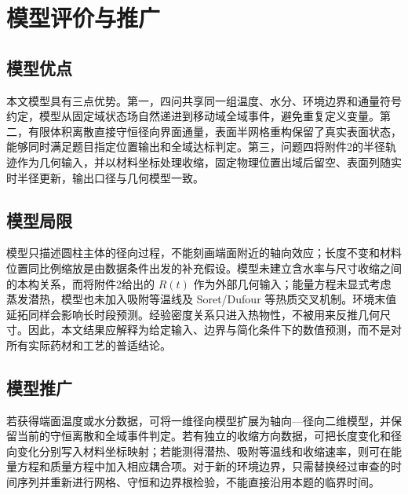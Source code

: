 \section{模型评价与推广}

\subsection{模型优点}

本文模型具有三点优势。第一，四问共享同一组温度、水分、环境边界和通量符号约定，模型从固定域状态场自然递进到移动域全域事件，避免重复定义变量。第二，有限体积离散直接守恒径向界面通量，表面半网格重构保留了真实表面状态，能够同时满足题目指定位置输出和全域达标判定。第三，问题四将附件2的半径轨迹作为几何输入，并以材料坐标处理收缩，固定物理位置出域后留空、表面列随实时半径更新，输出口径与几何模型一致。

\subsection{模型局限}

模型只描述圆柱主体的径向过程，不能刻画端面附近的轴向效应；长度不变和材料位置同比例缩放是由数据条件出发的补充假设。模型未建立含水率与尺寸收缩之间的本构关系，而将附件2给出的 $R(t)$ 作为外部几何输入；能量方程未显式考虑蒸发潜热，模型也未加入吸附等温线及 Soret/Dufour 等热质交叉机制。环境末值延拓同样会影响长时段预测。经验密度关系只进入热物性，不被用来反推几何尺寸。因此，本文结果应解释为给定输入、边界与简化条件下的数值预测，而不是对所有实际药材和工艺的普适结论。

\subsection{模型推广}

若获得端面温度或水分数据，可将一维径向模型扩展为轴向—径向二维模型，并保留当前的守恒离散和全域事件判定。若有独立的收缩方向数据，可把长度变化和径向变化分别写入材料坐标映射；若能测得潜热、吸附等温线和收缩速率，则可在能量方程和质量方程中加入相应耦合项。对于新的环境边界，只需替换经过审查的时间序列并重新进行网格、守恒和边界根检验，不能直接沿用本题的临界时间。
